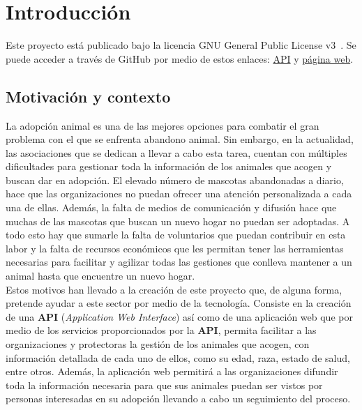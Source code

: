 \chapter{Introducción}\label{ch:introduccion}

Este proyecto está publicado bajo la licencia GNU General Public License v3~\cite{gplv3}.
Se puede acceder a través de GitHub por medio de estos enlaces: \href{https://github.com/Marodseg/confianza-animal-backend}{API}
y \href{https://github.com/Marodseg/confianza-animal-frontend}{página web}.


\section{Motivación y contexto}\label{sec:motivacion-y-contexto}

La adopción animal es una de las mejores opciones para combatir el gran problema con el que se enfrenta
abandono animal. Sin embargo, en la actualidad, las asociaciones que se dedican a llevar a cabo esta tarea,
cuentan con múltiples dificultades para gestionar toda la información de los animales
que acogen y buscan dar en adopción. El elevado número de mascotas abandonadas a diario, hace que
las organizaciones no puedan ofrecer una atención personalizada a cada una de ellas. Además, la falta de medios
de comunicación y difusión hace que muchas de las mascotas que buscan un nuevo hogar no
puedan ser adoptadas. A todo esto hay que sumarle la falta de voluntarios que puedan contribuir en esta labor y
la falta de recursos económicos que les permitan tener las herramientas necesarias para facilitar y agilizar
todas las gestiones que conlleva mantener a un animal hasta que encuentre un nuevo hogar. \\

Estos motivos han llevado a la creación de este proyecto que, de alguna forma, pretende ayudar a este sector
por medio de la tecnología. Consiste en la creación de una \textbf{API} (\textit{Application Web Interface}) así como de una aplicación web que por medio de
los servicios proporcionados por la \textbf{API}, permita facilitar a las organizaciones y protectoras la gestión de los
animales que acogen, con información detallada de cada uno de ellos, como su edad, raza, estado de salud, entre otros.
Además, la aplicación web permitirá a las organizaciones difundir toda la información necesaria para que sus animales
puedan ser vistos por personas interesadas en su adopción llevando a cabo un seguimiento del proceso. \\


